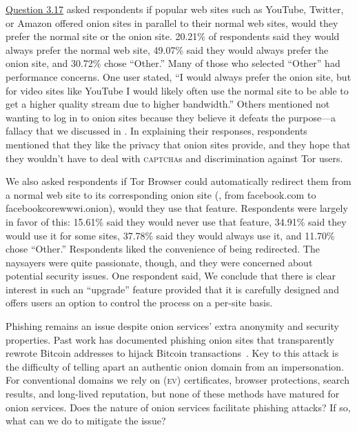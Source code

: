 \hyperref[q3_17]{Question 3.17} asked respondents if popular web sites such as
YouTube, Twitter, or Amazon offered onion sites in parallel to their normal web
sites, would they prefer the normal site or the onion site. 20.21\% of
respondents said they would always prefer the normal web site, 49.07\% said they
would always prefer the onion site, and 30.72\% chose ``Other.'' Many of those
who selected ``Other'' had performance concerns.  One user stated, ``I would
always prefer the onion site, but for video sites like YouTube I would likely
often use the normal site to be able to get a higher quality stream due to
higher bandwidth.'' Others mentioned not wanting to log in to onion sites
because they believe it defeats the purpose---a fallacy that we discussed in
.  In explaining their responses, respondents mentioned
that they like the privacy that onion sites provide, and they hope that they
wouldn't have to deal with \textsc{captcha}s and discrimination against Tor
users.


We also asked respondents if Tor Browser could automatically redirect them from
a normal web site to its corresponding onion site (\eg, from facebook.com to
facebookcorewwwi.onion), would they use that feature. Respondents were largely
in favor of this: 15.61\% said they would never use that feature, 34.91\% said
they would use it for some sites, 37.78\% said they would always use it, and
11.70\% chose ``Other.'' Respondents liked the convenience of being redirected.
The naysayers were quite passionate, though, and they were concerned about
potential security issues. One respondent said,
We conclude that there is clear interest in such an ``upgrade'' feature provided
that it is carefully designed and offers users an option to control the process
on a per-site basis.

Phishing remains an issue despite onion services' extra anonymity and security
properties.  Past work has documented phishing onion sites that transparently
rewrote Bitcoin addresses to hijack Bitcoin
transactions~\cite{Winter2016a,Nurmi2015a,Monteiro2016a}.  Key to this attack is
the difficulty of telling apart an authentic onion domain from an impersonation.
For conventional domains we rely on (\textsc{ev}) certificates, browser
protections, search results, and long-lived reputation, but none of these
methods have matured for onion services.  Does the nature of onion services
facilitate phishing attacks?  If so, what can we do to mitigate the issue?

